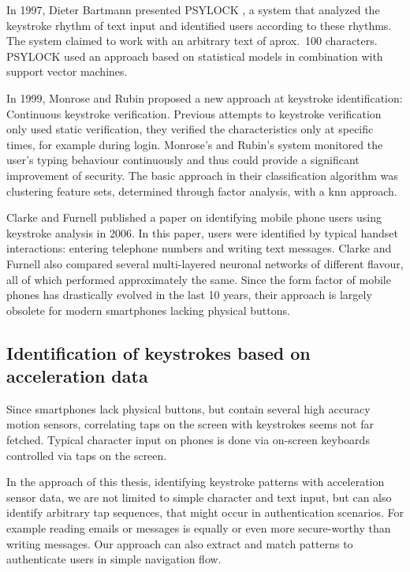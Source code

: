 In 1997, Dieter Bartmann presented PSYLOCK \cite{bartmann1997psylock}, a system that analyzed the key\-stroke rhythm of text input and identified users according to these rhythms. The system claimed to work with an arbitrary text of aprox.\ 100 characters. PSYLOCK used an approach based on statistical models in combination with support vector machines.

In 1999, Monrose and Rubin \cite{monrose2000keystroke} proposed a new approach at keystroke identification: Continuous keystroke verification. Previous attempts to keystroke verification only used static verification, \ie they verified the characteristics only at specific times, for example during login. Monrose's and Rubin's system monitored the user's typing behaviour continuously and thus could provide a significant improvement of security. The basic approach in their classification algorithm was clustering feature sets, determined through factor analysis, with a \gls{knn} approach.

Clarke and Furnell \cite{clarke2007authenticating} published a paper on identifying mobile phone users using keystroke analysis in 2006. In this paper, users were identified by typical handset interactions: entering telephone numbers and writing text messages.  Clarke and Furnell also compared several multi-layered neuronal networks of different flavour, all of which performed approximately the same. Since the form factor of mobile phones has drastically evolved in the last 10 years, their approach is largely obsolete for modern smartphones lacking physical buttons.

\subsection{Identification of keystrokes based on acceleration data}\label{subsection:keystrokerecognition}
Since smartphones lack physical buttons, but contain several high accuracy motion sensors, correlating taps on the screen with keystrokes seems not far fetched. Typical character input on phones is done via on-screen keyboards controlled via taps on the screen. 

In the approach of this thesis, identifying keystroke patterns with acceleration sensor data, we are not limited to simple character and text input, but can also identify arbitrary tap sequences, that might occur in authentication scenarios. For example reading emails or messages is equally or even more secure-worthy than writing messages. Our approach can also extract and match patterns to authenticate users in simple navigation flow.


